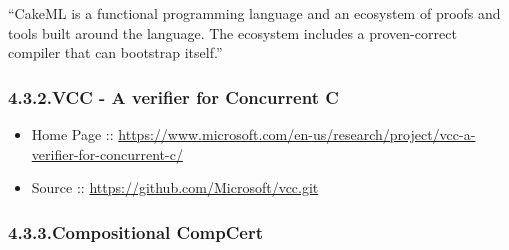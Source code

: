 \documentclass[12pt,twoside]{article}
\begin{document}
\noindent{}\textquotedblleft{}CakeML is a functional programming language and an ecosystem of proofs
and tools built around the language. The ecosystem includes a
proven-correct compiler that can bootstrap itself.\textquotedblright{}%

\subsubsection{4.3.2.\hspace*{0.5em}VCC - A verifier for Concurrent C}\label{sec-vcc---a-verifier-for-concurrent-c}%

\begin{itemize}[noitemsep,topsep=\mdcompacttopsep]%

\item{}Home Page :: \href{https://www.microsoft.com/en-us/research/project/vcc-a-verifier-for-concurrent-c/}{{\ttfamily https://\hspace{0pt}www.\hspace{0pt}microsoft.\hspace{0pt}com/\hspace{0pt}en-\hspace{0pt}us/\hspace{0pt}research/\hspace{0pt}project/\hspace{0pt}vcc-\hspace{0pt}a-\hspace{0pt}verifier-\hspace{0pt}for-\hspace{0pt}concurrent-\hspace{0pt}c/\hspace{0pt}}}%

\item{}Source :: \href{https://github.com/Microsoft/vcc.git}{{\ttfamily https://\hspace{0pt}github.\hspace{0pt}com/\hspace{0pt}Microsoft/\hspace{0pt}vcc.\hspace{0pt}git}}%
\end{itemize}%

\subsubsection{4.3.3.\hspace*{0.5em}Compositional CompCert}\label{sec-compositional-compcert}%
\end{document}

